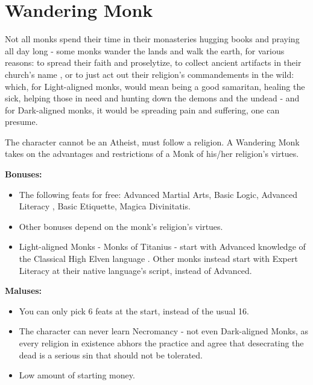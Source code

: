 \section{Wandering Monk}
Not all monks spend their time in their monasteries hugging books and praying all day long - some monks wander the lands and walk the earth, for various reasons: to spread their faith and proselytize, to collect ancient artifacts in their church's name , or to just act out their religion's commandements in the wild: which, for Light-aligned monks, would mean being a good samaritan, healing the sick, helping those in need and hunting down the demons and the undead - and for Dark-aligned monks, it would be spreading pain and suffering, one can presume. 

The character cannot be an Atheist, must follow a religion. A Wandering Monk takes on the advantages and restrictions of a Monk of his/her religion's virtues.

\textbf{Bonuses:}
\begin{itemize}
	\item The following feats for free: Advanced Martial Arts, Basic Logic, Advanced Literacy , Basic Etiquette, Magica Divinitatis.
	\item Other bonuses depend on the monk's religion's virtues.
	\item Light-aligned Monks - Monks of Titanius - start with Advanced knowledge of the Classical High Elven language . Other monks instead start with Expert Literacy at their native language's script, instead of Advanced.
\end{itemize}


\textbf{Maluses:}
\begin{itemize}
	\item You can only pick 6 feats at the start, instead of the usual 16.
	\item The character can never learn Necromancy - not even Dark-aligned Monks, as every religion in existence  abhors the practice and agree that desecrating the dead is a serious sin that should not be tolerated.
	\item Low amount of starting money.
\end{itemize}
